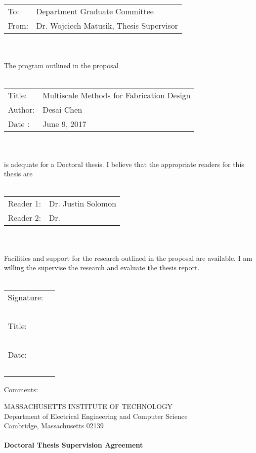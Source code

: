 \documentclass[11pt]{article}
\begin{document}
\begin{tabular}{p{2cm} p{10cm}}
	To: & Department Graduate Committee \\
	From: & Dr. Wojciech Matusik, Thesis Supervisor
\end{tabular}\\~\\
The program outlined in the proposal\\~\\
\begin{tabular}{p{2cm} l}
	Title: & Multiscale Methods for Fabrication Design\\
	Author: & Desai Chen\\
	Date : & June 9, 2017
\end{tabular}\\~\\
is adequate for a Doctoral thesis. I believe that the appropriate readers for this thesis are\\~\\
\begin{tabular}{p{2cm} l}
	Reader 1: & Dr. Justin Solomon\\
	Reader 2: & Dr.
\end{tabular}\\~\\
Facilities and support for the research outlined in the proposal are available.
I am willing the supervise the research and evaluate the thesis report.\\~\\
\begin{flushright}
	\begin{tabular}{l l}
		Signature: & \underline{\hspace{6cm}}\\~\\
		Title: & \underline{\hspace{6cm}}\\~\\
		Date: & \underline{\hspace{6cm}}\\~\\
	\end{tabular}
\end{flushright}
Comments:
\newpage
\begin{center}
	MASSACHUSETTS INSTITUTE OF TECHNOLOGY\\
	Department of Electrical Engineering and Computer Science\\
	Cambridge, Massachusetts 02139\\~\\
	\textbf{Doctoral Thesis Supervision Agreement}\\~\\
\end{center}
\end{document}
